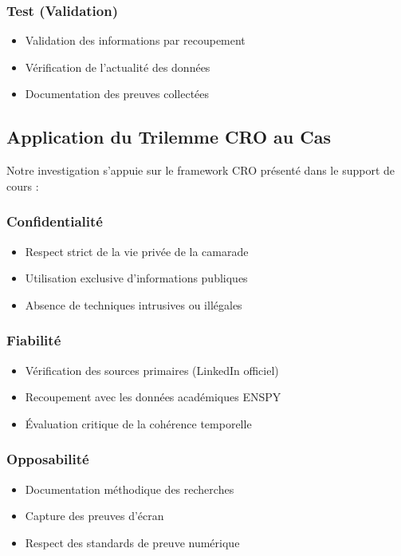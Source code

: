 \documentclass[12pt, a4paper]{article}
\begin{document}
\subsubsection{Test (Validation)}
\begin{itemize}
    \item Validation des informations par recoupement
    \item Vérification de l'actualité des données
    \item Documentation des preuves collectées
\end{itemize}

\subsection{Application du Trilemme CRO au Cas}

Notre investigation s'appuie sur le framework CRO présenté dans le support de cours :

\subsubsection{Confidentialité}
\begin{itemize}
    \item Respect strict de la vie privée de la camarade
    \item Utilisation exclusive d'informations publiques
    \item Absence de techniques intrusives ou illégales
\end{itemize}

\subsubsection{Fiabilité}
\begin{itemize}
    \item Vérification des sources primaires (LinkedIn officiel)
    \item Recoupement avec les données académiques ENSPY
    \item Évaluation critique de la cohérence temporelle
\end{itemize}

\subsubsection{Opposabilité}
\begin{itemize}
    \item Documentation méthodique des recherches
    \item Capture des preuves d'écran
    \item Respect des standards de preuve numérique
\end{itemize}
\end{document}
